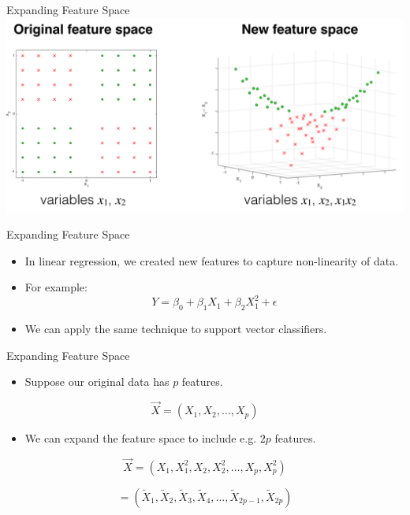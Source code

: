 \begin{frame}{Expanding Feature Space}
    \centering
    \includegraphics[width=\textwidth]{images/support-vector-machines/support-vector-machines-18.png}
\end{frame}


\begin{frame}{Expanding Feature Space}
    \begin{itemize}
        \item In linear regression, we created new features to capture non-linearity of data.
        \item For example:
        \[
        Y = \beta_0 + \beta_1 X_1 + \beta_2 X_1^2 + \epsilon
        \]
        \item We can apply the same technique to support vector classifiers.
    \end{itemize}
\end{frame}

\begin{frame}{Expanding Feature Space}
    \begin{itemize}
        \item Suppose our original data has $p$ features.
    \end{itemize}

    \[
    \vec{X} = (X_1, X_2, \ldots, X_p)
    \]

    \begin{itemize}
        \item We can expand the feature space to include e.g. $2p$ features.
    \end{itemize}

    \[
    \vec{X} = (X_1, X_1^2, X_2, X_2^2, \ldots, X_p, X_p^2)
    \]

    \[
    = (\tilde{X}_1, \tilde{X}_2, \tilde{X}_3, \tilde{X}_4, \ldots, \tilde{X}_{2p-1}, \tilde{X}_{2p})
    \]
\end{frame}

